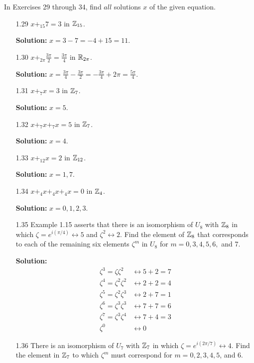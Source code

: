\noindent In Exercises 29 through 34, find $\textit{all}$ solutions $x$ of the
given equation.
\begin{enumerate}
   \item[1.29] $x +_{15} 7 = 3$ in $\mathbb{Z}_{15}$.
		
		\textbf{Solution:} $x = 3 - 7 = -4 + 15 = 11$.
   \item[1.30] $x +_{2\pi} \frac{3\pi}{2} = \frac{3\pi}{4}$ in $\mathbb{R}_{2\pi}$.
		
		\textbf{Solution:} $x = \frac{3\pi}{4} - \frac{3\pi}{2} =
		-\frac{3\pi}{4} + 2\pi = \frac{5\pi}{4}$.
   \item[1.31] $x +_7 x = 3$ in $\mathbb{Z}_7$.
		
		\textbf{Solution:} $x = 5$.
   \item[1.32] $x +_7 x +_7 x = 5$ in $\mathbb{Z}_7$.
		
		\textbf{Solution:} $x = 4$.
   \item[1.33] $x +_{12} x = 2$ in $\mathbb{Z}_{12}$.
		
		\textbf{Solution:} $x = 1, 7$.
   \item[1.34] $x +_4 x +_4 x +_4 x = 0$ in $\mathbb{Z}_4$.
		
		\textbf{Solution:} $x = 0, 1, 2, 3$.
   \item[1.35] Example 1.15 asserts that there is an isomorphism of $U_8$ with
               $\mathbb{Z}_8$ in which $\zeta = e^{i(\pi/4)} \leftrightarrow 5$ and
               $\zeta^2 \leftrightarrow 2$. Find the element of $\mathbb{Z}_8$ that
               corresponds to each of the remaining six elements $\zeta^m$ in
               $U_8$ for $m = 0, 3, 4, 5, 6,$ and 7.

      \textbf{Solution:}
      \begin{align*}
         \zeta^3 = \zeta\zeta^2 &\leftrightarrow 5 + 2 = 7 \\
         \zeta^4 = \zeta ^2\zeta^2 &\leftrightarrow 2 + 2 = 4 \\
         \zeta^5 = \zeta ^2\zeta^3 &\leftrightarrow 2 + 7 = 1 \\
         \zeta^6 = \zeta ^3\zeta^3 &\leftrightarrow 7 + 7 = 6 \\
         \zeta^7 = \zeta ^3\zeta^4 &\leftrightarrow 7 + 4 = 3 \\
         \zeta^0 &\leftrightarrow 0
      \end{align*}
   \item[1.36] There is an isomorphism of $U_7$ with $\mathbb{Z}_7$ in which
               $\zeta = e^{i(2\pi/7)} \leftrightarrow 4$. Find the element in
               $\mathbb{Z}_7$ to which $\zeta^m$ must correspond for
               $m = 0, 2, 3, 4, 5$, and 6.


\end{enumerate}
